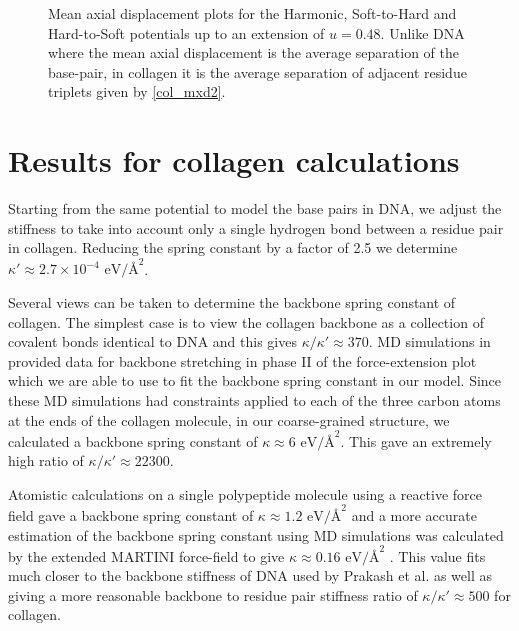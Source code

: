 \begin{figure}[H]
\begin{tabular}{cc}
\end{tabular}
\caption{Mean axial displacement plots for the Harmonic, Soft-to-Hard and Hard-to-Soft potentials up to an extension of $u=0.48$. Unlike DNA where the mean axial displacement is the average separation of the base-pair, in collagen it is the average separation of adjacent residue triplets given by \eqref{col_mxd2}.}
\label{fig:col_mxd}
\end{figure}

\section{Results for collagen calculations}

Starting from the same potential to model the base pairs in DNA, we adjust the stiffness to take into account only a single hydrogen bond between a residue pair in collagen. Reducing the spring constant by a factor of 2.5 we determine $\kappa' \approx 2.7 \times 10^{-4}\text{ eV/\AA}^{2}$.

Several views can be taken to determine the backbone spring constant of collagen. The simplest case is to view the collagen backbone as a collection of covalent bonds identical to DNA and this gives $\kappa/\kappa' \approx 370$. MD simulations in \cite{Buehler2007} provided data for backbone stretching in phase II of the force-extension plot  which we are able to use to fit the backbone spring constant in our model. Since these MD simulations had constraints applied to each of the three carbon atoms at the ends of the collagen molecule, in our coarse-grained structure, we calculated a backbone spring constant of $\kappa \approx 6 \text{ eV/\AA}^{2}$. This gave an extremely high ratio of $\kappa/\kappa' \approx 22300$.

Atomistic calculations on a single polypeptide molecule using a reactive force field gave a backbone spring constant of $\kappa \approx 1.2 \text{ eV/\AA}^{2}$ \cite{Buehler2006} and a more accurate estimation of the backbone spring constant using MD simulations was calculated by the extended MARTINI force-field to give $\kappa \approx 0.16 \text{ eV/\AA}^{2}$ \cite{Gautieri2010}. This value fits much closer to the backbone stiffness of DNA used by Prakash et al. as well as giving a more reasonable backbone to residue pair stiffness ratio of $\kappa/\kappa' \approx 500$ for collagen.

